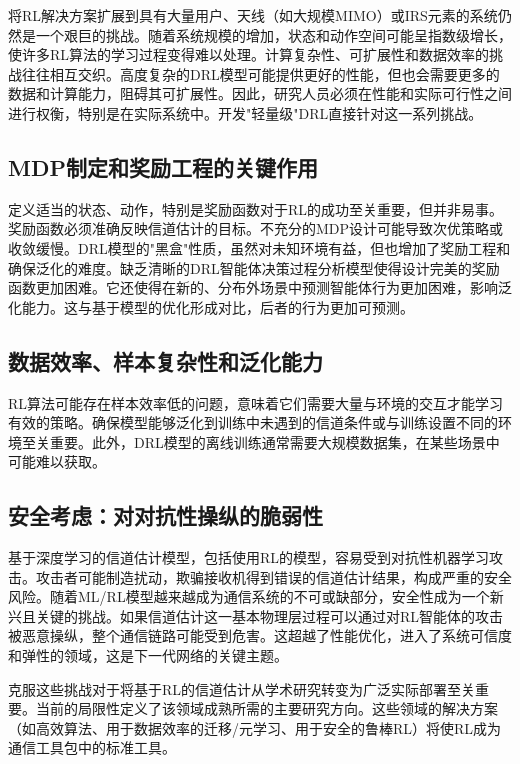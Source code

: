 \documentclass[journal]{IEEEtran}
\begin{document}
将RL解决方案扩展到具有大量用户、天线（如大规模MIMO）或IRS元素的系统仍然是一个艰巨的挑战\cite{ref7}。随着系统规模的增加，状态和动作空间可能呈指数级增长，使许多RL算法的学习过程变得难以处理\cite{ref13}。计算复杂性、可扩展性和数据效率的挑战往往相互交织。高度复杂的DRL模型可能提供更好的性能，但也会需要更多的数据和计算能力，阻碍其可扩展性。因此，研究人员必须在性能和实际可行性之间进行权衡，特别是在实际系统中。开发"轻量级"DRL\cite{ref46}直接针对这一系列挑战。

\subsection{MDP制定和奖励工程的关键作用}

定义适当的状态、动作，特别是奖励函数对于RL的成功至关重要，但并非易事\cite{ref7}。奖励函数必须准确反映信道估计的目标。不充分的MDP设计可能导致次优策略或收敛缓慢。DRL模型的"黑盒"性质，虽然对未知环境有益，但也增加了奖励工程和确保泛化的难度。缺乏清晰的DRL智能体决策过程分析模型使得设计完美的奖励函数更加困难\cite{ref7}。它还使得在新的、分布外场景中预测智能体行为更加困难，影响泛化能力\cite{ref11}。这与基于模型的优化形成对比，后者的行为更加可预测。

\subsection{数据效率、样本复杂性和泛化能力}

RL算法可能存在样本效率低的问题，意味着它们需要大量与环境的交互才能学习有效的策略\cite{ref11}。确保模型能够泛化到训练中未遇到的信道条件或与训练设置不同的环境至关重要\cite{ref3}。此外，DRL模型的离线训练通常需要大规模数据集\cite{ref46}，在某些场景中可能难以获取。

\subsection{安全考虑：对对抗性操纵的脆弱性}

基于深度学习的信道估计模型，包括使用RL的模型，容易受到对抗性机器学习攻击\cite{ref4}。攻击者可能制造扰动，欺骗接收机得到错误的信道估计结果，构成严重的安全风险\cite{ref5}。随着ML/RL模型越来越成为通信系统的不可或缺部分，安全性成为一个新兴且关键的挑战。如果信道估计这一基本物理层过程可以通过对RL智能体的攻击被恶意操纵，整个通信链路可能受到危害。这超越了性能优化，进入了系统可信度和弹性的领域，这是下一代网络的关键主题\cite{ref4}。

克服这些挑战对于将基于RL的信道估计从学术研究转变为广泛实际部署至关重要。当前的局限性定义了该领域成熟所需的主要研究方向。这些领域的解决方案（如高效算法、用于数据效率的迁移/元学习、用于安全的鲁棒RL）将使RL成为通信工具包中的标准工具。
\end{document}
